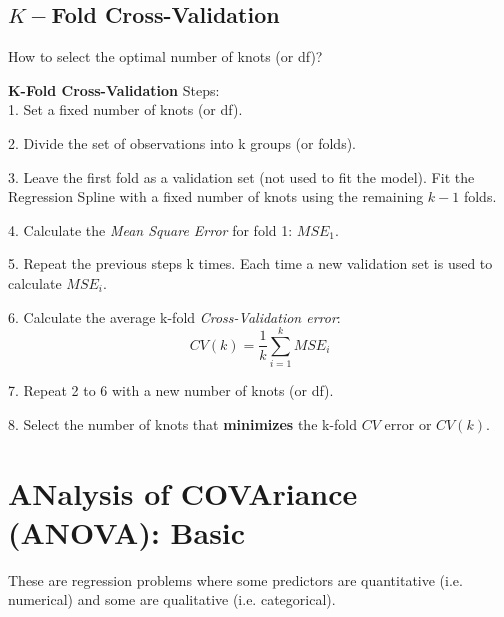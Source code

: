 \documentclass[11pt,a4paper]{article}
\begin{document}
\subsection{$K-$Fold Cross-Validation}
\begin{center}
    How to select the optimal number of knots (or df)?
\end{center}
\textbf{K-Fold Cross-Validation} Steps:\\
1. Set a fixed number of knots (or df).

2. Divide the set of observations into k groups (or folds).

3. Leave the first fold as a validation set (not used to fit the model). Fit the Regression Spline with a fixed number of knots using the remaining $k-1$ folds.

4. Calculate the \textit{Mean Square Error} for fold 1: ${MSE}_1$.

5. Repeat the previous steps k times. Each time a new validation set is used to calculate ${MSE}_i$.

6. Calculate the average k-fold \textit{Cross-Validation error}: $${CV}(k) = \frac{1}{k} \sum_{i=1}^{k}{MSE}_i$$

7. Repeat 2 to 6 with a new number of knots (or df).

8. Select the number of knots that \textbf{minimizes} the k-fold ${CV}$ error or ${CV}(k)$.







\section{ANalysis of COVAriance (ANOVA): Basic}
These are regression problems where some predictors are quantitative (i.e. numerical) and some are qualitative (i.e. categorical).
\end{document}
